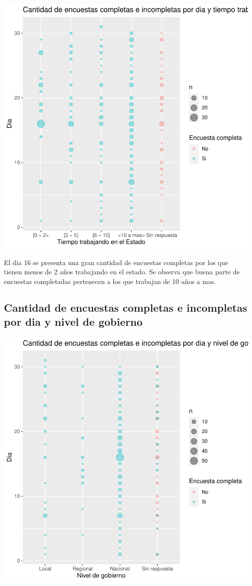 \documentclass{article}
\begin{document}
\includegraphics{seguimientov3-080}

El dia 16 se presenta una gran cantidad de encuestas completas por los que tienen menos de 2 años trabajando en el estado. Se observa que buena parte de encuestas completadas pertenecen a los que trabajan de 10 años a mas.

\subsection{Cantidad de encuestas completas e incompletas por dia y nivel de gobierno}

\includegraphics{seguimientov3-081}
\end{document}
